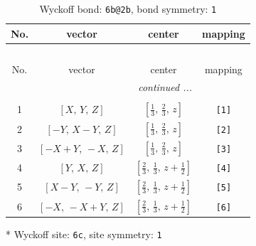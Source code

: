 \documentclass[fleqn,8pt]{jsarticle}
\begin{document}
\renewcommand{\arraystretch}{1.2}
\begin{longtable}{cccc}
\caption{Wyckoff bond: {\tt 6b@2b}, bond symmetry: {\tt 1}}
 \\
 \hline \hline
No. & vector & center & mapping \\ \hline \endfirsthead

\multicolumn{3}{l}{\tablename\ \thetable{}} \\
 \hline \hline
No. & vector & center & mapping \\ \hline \endhead

 \hline \hline
\multicolumn{3}{r}{\footnotesize\it continued ...} \\ \endfoot

 \hline \hline
\multicolumn{3}{r}{} \\ \endlastfoot

1 & $\left[ X,\, Y,\, Z \right]$ & $\left[ \frac{1}{3},\, \frac{2}{3},\, z \right]$ & {\tt [1]} \\ \hline
2 & $\left[ - Y,\, X - Y,\, Z \right]$ & $\left[ \frac{1}{3},\, \frac{2}{3},\, z \right]$ & {\tt [2]} \\ \hline
3 & $\left[ - X + Y,\, - X,\, Z \right]$ & $\left[ \frac{1}{3},\, \frac{2}{3},\, z \right]$ & {\tt [3]} \\ \hline
4 & $\left[ Y,\, X,\, Z \right]$ & $\left[ \frac{2}{3},\, \frac{1}{3},\, z + \frac{1}{2} \right]$ & {\tt [4]} \\ \hline
5 & $\left[ X - Y,\, - Y,\, Z \right]$ & $\left[ \frac{2}{3},\, \frac{1}{3},\, z + \frac{1}{2} \right]$ & {\tt [5]} \\ \hline
6 & $\left[ - X,\, - X + Y,\, Z \right]$ & $\left[ \frac{2}{3},\, \frac{1}{3},\, z + \frac{1}{2} \right]$ & {\tt [6]} \\
\end{longtable}
* Wyckoff site: {\tt 6c}, site symmetry: {\tt 1}
\renewcommand{\arraystretch}{1.2}
\end{document}
